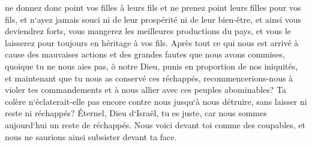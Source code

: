 \verse ne donnez donc point vos filles à leurs fils et ne prenez point leurs filles pour vos fils, et n`ayez jamais souci ni de leur prospérité ni de leur bien-être, et ainsi vous deviendrez forts, vous mangerez les meilleures productions du pays, et vous le laisserez pour toujours en héritage à vos fils. 
\verse Après tout ce qui nous est arrivé à cause des mauvaises actions et des grandes fautes que nous avons commises, quoique tu ne nous aies pas, ô notre Dieu, punis en proportion de nos iniquités, et maintenant que tu nous as conservé ces réchappés, 
\verse recommencerions-nous à violer tes commandements et à nous allier avec ces peuples abominables? Ta colère n`éclaterait-elle pas encore contre nous jusqu`à nous détruire, sans laisser ni reste ni réchappés? 
\verse Éternel, Dieu d`Israël, tu es juste, car nous sommes aujourd`hui un reste de réchappés. Nous voici devant toi comme des coupables, et nous ne saurions ainsi subsister devant ta face. 

